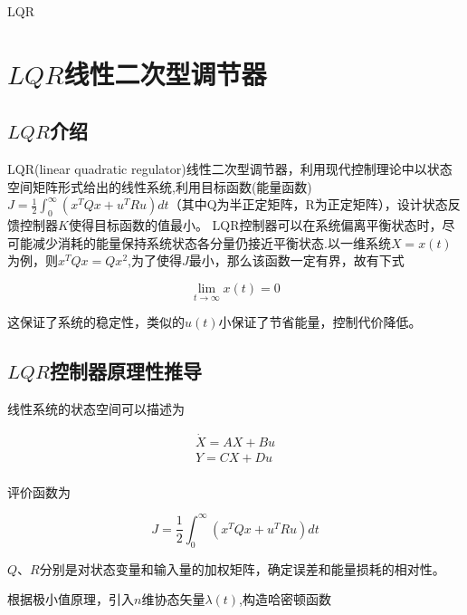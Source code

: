 \documentclass{MathorCupmodeling}
\begin{document}
\begin{center}
{\Large LQR}

\end{center}
    \newpage


	\section{$LQR$线性二次型调节器}

\subsection{$LQR$介绍}

LQR(linear quadratic regulator)线性二次型调节器，利用现代控制理论中以状态空间矩阵形式给出的线性系统,利用目标函数(能量函数)$J=\frac{1}{2}\int_0^\infty(x^TQx+u^TRu)dt$（其中Q为半正定矩阵，R为正定矩阵），设计状态反馈控制器$K$使得目标函数的值最小。
LQR控制器可以在系统偏离平衡状态时，尽可能减少消耗的能量保持系统状态各分量仍接近平衡状态.以一维系统$X=x(t)$为例，则$x^TQx=Qx^2$,为了使得$J$最小，那么该函数一定有界，故有下式

\begin{equation}
\lim_{t \rightarrow \infty}x(t)=0
\end{equation}

这保证了系统的稳定性，类似的$u(t)$小保证了节省能量，控制代价降低。

\subsection{$LQR$控制器原理性推导}

线性系统的状态空间可以描述为
	
\begin{equation}
\begin{aligned}
\dot X=AX+Bu\\
Y=CX+Du\\
\end{aligned}
\end{equation}

评价函数为

\begin{equation}
J=\frac{1}{2}\int_0^\infty(x^TQx+u^TRu)dt
\end{equation}

$Q、R$分别是对状态变量和输入量的加权矩阵，确定误差和能量损耗的相对性。

根据极小值原理，引入$n$维协态矢量$\lambda(t)$,构造哈密顿函数
\end{document}

